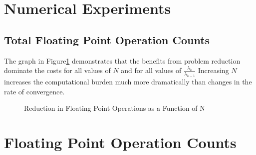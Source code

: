 \documentclass{article}
\begin{document}
{\section{Numerical Experiments}

\subsection{Total Floating Point Operation Counts}
\label{sec:summaryFlops}



\label{sec:exper}


The graph in Figure\ref{fig:simsFLOPS} demonstrates that the benefits from problem reduction dominate
the costs for all values of $N$ and for all values of $\frac{\lambda_k}{\lambda_{k-1}}$
Increasing $N$ increases the computational burden much more dramatically than 
changes in the rate of convergence.


\begin{figure}[htbp]
  \begin{center}
    \leavevmode
{}    
    \caption{Reduction in Floating Point Operations as a Function of N}
    \label{fig:simsFLOPS}
  \end{center}
\end{figure}

\label{sec:numericalExp}





\appendix




\setcounter{thrm}{0}
\setcounter{crrlry}{0}



\section{Floating Point Operation Counts}
\label{sec:flops}


}
\end{document}
